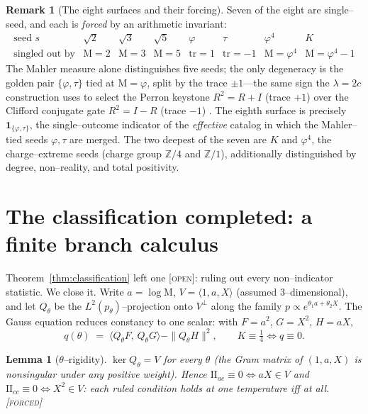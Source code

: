 \documentclass[11pt]{article}
\newtheorem{lemma}[theorem]{Lemma}
\theoremstyle{definition}
\newtheorem{remark}[theorem]{Remark}
\newcommand{\ph}{\varphi}
\newcommand{\Z}{\mathbb{Z}}
\newcommand{\Mah}{\mathrm{M}}
\newcommand{\forcedtag}{{\scshape [forced]}}
\newcommand{\opentag}{{\scshape [open]}}
\begin{document}
\begin{remark}[The eight surfaces and their forcing]
Seven of the eight are single--seed, and each is \emph{forced} by an arithmetic invariant:
\[
\begin{array}{lccccccc}
\text{seed } s & \sqrt2 & \sqrt3 & \sqrt5 & \ph & \tau & \ph^4 & K\\[1pt]
\text{singled out by} & \Mah{=}2 & \Mah{=}3 & \Mah{=}5 & \mathrm{tr}{=}1 & \mathrm{tr}{=}{-}1 & \Mah{=}\ph^4 & \Mah{=}\ph^4{-}1
\end{array}
\]
The Mahler measure alone distinguishes five seeds; the only degeneracy is the golden pair
$\{\ph,\tau\}$ tied at $\Mah=\ph$, split by the trace $\pm1$---the same sign the $\lambda=2c$
construction uses to select the Perron keystone $R^2=R+I$ (trace $+1$) over the Clifford conjugate gate
$R^2=I-R$ (trace $-1$) \cite{lambda}. The eighth surface is precisely $\mathbf 1_{\{\ph,\tau\}}$, the
single--outcome indicator of the \emph{effective} catalog in which the Mahler--tied seeds $\ph,\tau$ are
merged. The two deepest of the seven are $K$ and $\ph^4$, the charge--extreme seeds (charge group $\Z/4$
and $\Z/1$), additionally distinguished by degree, non--reality, and total positivity.
\end{remark}

\section{The classification completed: a finite branch calculus}\label{sec:classdone}
Theorem~\ref{thm:classification} left one \opentag: ruling out every non--indicator statistic. We
close it. Write $a=\log\Mah$, $V=\langle1,a,X\rangle$ (assumed $3$--dimensional), and let $Q_\theta$
be the $L^2(p_\theta)$--projection onto $V^\perp$ along the family $p\propto e^{\theta_1a+\theta_2X}$.
The Gauss equation reduces constancy to one scalar: with $F=a^2$, $G=X^2$, $H=aX$,
\[
q(\theta)\;=\;\langle Q_\theta F,\,Q_\theta G\rangle-\|Q_\theta H\|^2,
\qquad K\equiv\tfrac14\iff q\equiv0 .
\]

\begin{lemma}[$\theta$--rigidity]\label{lem:rigid}
$\ker Q_\theta=V$ for every $\theta$ (the Gram matrix of $(1,a,X)$ is nonsingular under any positive
weight). Hence $\mathrm{II}_{ac}\equiv0\iff aX\in V$ and $\mathrm{II}_{cc}\equiv0\iff X^2\in V$: each
ruled condition holds at one temperature iff at all. \forcedtag
\end{lemma}
\end{document}
